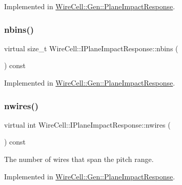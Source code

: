 Implemented in \hyperlink{class_wire_cell_1_1_gen_1_1_plane_impact_response_ae0d3d3611d894db56f398abbf67d3373}{Wire\+Cell\+::\+Gen\+::\+Plane\+Impact\+Response}.

\mbox{\label{class_wire_cell_1_1_i_plane_impact_response_acc087884ba0315e588e29398062ed12e}} 
\subsubsection{\texorpdfstring{nbins()}{nbins()}}
{\footnotesize\ttfamily virtual size\+\_\+t Wire\+Cell\+::\+I\+Plane\+Impact\+Response\+::nbins (\begin{DoxyParamCaption}{ }\end{DoxyParamCaption}) const\hspace{0.3cm}{\ttfamily [pure virtual]}}



Implemented in \hyperlink{class_wire_cell_1_1_gen_1_1_plane_impact_response_ae6ff423372c28e1fec5e13a47d1648d2}{Wire\+Cell\+::\+Gen\+::\+Plane\+Impact\+Response}.

\mbox{\label{class_wire_cell_1_1_i_plane_impact_response_abe58b933a8ba84911d705f46f277b306}} 
\subsubsection{\texorpdfstring{nwires()}{nwires()}}
{\footnotesize\ttfamily virtual int Wire\+Cell\+::\+I\+Plane\+Impact\+Response\+::nwires (\begin{DoxyParamCaption}{ }\end{DoxyParamCaption}) const\hspace{0.3cm}{\ttfamily [pure virtual]}}



The number of wires that span the pitch range. 



Implemented in \hyperlink{class_wire_cell_1_1_gen_1_1_plane_impact_response_a8fc3604f6bd80d29095f205c59b768c2}{Wire\+Cell\+::\+Gen\+::\+Plane\+Impact\+Response}.

